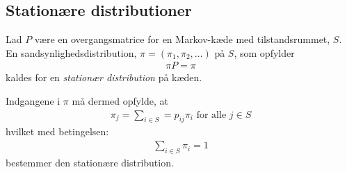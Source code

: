 \subsection{Stationære distributioner}


\begin{minipage}\textwidth
\begin{defn}\textbf{} %
\newline
Lad $P$ være en overgangsmatrice for en Markov-kæde med tilstandsrummet, $S$. En sandsynlighedsdistribution, $\pi=(\pi_1,\pi_2,\dots)$ på $S$, som opfylder
\begin{align*}
    \pi P=\pi
\end{align*}
kaldes for en \textit{stationær distribution} på kæden. 
\end{defn}
\end{minipage}

Indgangene i $\pi$ må dermed opfylde, at
\begin{align*}
    \pi_j=\sum_{i\in S}=p_{ij}\pi_i \text{ for alle } j\in S
\end{align*}
hvilket med betingelsen:
\begin{align*}
    \sum_{i\in S} \pi_i=1
\end{align*}
bestemmer den stationære distribution. 